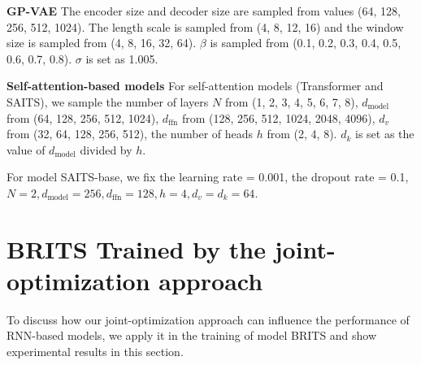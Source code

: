 \documentclass{article}
\begin{document}
\textbf{GP-VAE} \hspace{1em}
The encoder size and decoder size are sampled from values (64, 128, 256, 512, 1024). The length scale is sampled from (4, 8, 12, 16) and the window size is sampled from (4, 8, 16, 32, 64). $\beta$ is sampled from (0.1, 0.2, 0.3, 0.4, 0.5, 0.6, 0.7, 0.8). $\sigma$ is set as 1.005.

\textbf{Self-attention-based models} \hspace{1em} 
For self-attention models (Transformer and SAITS), we sample the number of layers $N$ from (1, 2, 3, 4, 5, 6, 7, 8), $d_\text{model}$ from (64, 128, 256, 512, 1024), $d_\text{ffn}$ from (128, 256, 512, 1024, 2048, 4096), $d_v$ from (32, 64, 128, 256, 512), the number of heads $h$ from (2, 4, 8). $d_k$ is set as the value of $d_\text{model}$ divided by $h$.

For model SAITS-base, we fix the learning rate = 0.001, the dropout rate = 0.1, $N = 2, d_\text{model} = 256, d_\text{ffn} = 128, h = 4, d_v = d_k = 64$.

\section{BRITS Trained by the joint-optimization approach} \label{BRITS_apply_MIT}
\begin{table} [ht]
	\caption{Performance comparison between BRITS trained without MIT and with MIT.}
	\label{BRITS_MIT_results}
	\centering
	\begin{minipage}{1\textwidth}
\end{minipage}
\end{table}

To discuss how our joint-optimization approach can influence the performance of RNN-based models, we apply it in the training of model BRITS and show experimental results in this section. 
\end{document}
